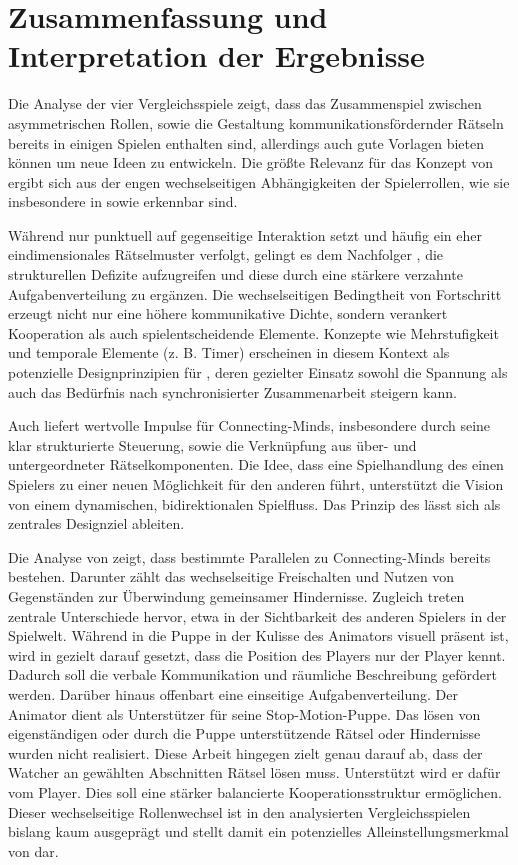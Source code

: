 \section{Zusammenfassung und Interpretation der Ergebnisse}
Die Analyse der vier Vergleichsspiele zeigt, dass das Zusammenspiel zwischen asymmetrischen Rollen, sowie die Gestaltung kommunikationsfördernder Rätseln  bereits in einigen Spielen enthalten sind, allerdings auch gute Vorlagen bieten können um neue Ideen zu entwickeln.
Die größte Relevanz für das Konzept von  ergibt sich aus der engen wechselseitigen Abhängigkeiten der Spielerrollen, wie sie insbesondere in  sowie  erkennbar sind.

Während  nur punktuell auf gegenseitige Interaktion setzt und häufig ein eher eindimensionales Rätselmuster verfolgt, gelingt es dem Nachfolger , die strukturellen Defizite aufzugreifen und diese durch eine stärkere verzahnte Aufgabenverteilung zu ergänzen. Die wechselseitigen Bedingtheit von Fortschritt erzeugt nicht nur eine höhere kommunikative Dichte, sondern verankert Kooperation als auch spielentscheidende Elemente. Konzepte wie Mehrstufigkeit und temporale Elemente (z. B. Timer) erscheinen in diesem Kontext als potenzielle Designprinzipien für , deren gezielter Einsatz sowohl die Spannung als auch das Bedürfnis nach synchronisierter Zusammenarbeit steigern kann.

Auch  liefert wertvolle Impulse für Connecting-Minds, insbesondere durch seine klar strukturierte Steuerung, sowie die Verknüpfung aus über- und untergeordneter Rätselkomponenten. Die Idee, dass eine Spielhandlung des einen Spielers zu einer neuen Möglichkeit für den anderen führt, unterstützt die Vision von einem dynamischen, bidirektionalen Spielfluss. Das Prinzip des  lässt sich als zentrales Designziel ableiten.

Die Analyse von  zeigt, dass bestimmte Parallelen zu Connecting-Minds bereits bestehen. Darunter zählt das wechselseitige Freischalten und Nutzen von Gegenständen zur Überwindung gemeinsamer Hindernisse. Zugleich treten zentrale Unterschiede hervor, etwa in der Sichtbarkeit des anderen Spielers in der Spielwelt. Während in  die Puppe in der Kulisse des Animators visuell präsent ist, wird in  gezielt darauf gesetzt, dass die Position des Players nur der Player kennt. Dadurch soll die verbale Kommunikation und räumliche Beschreibung gefördert werden.
Darüber hinaus offenbart  eine einseitige Aufgabenverteilung. Der Animator dient als Unterstützer für seine Stop-Motion-Puppe. Das lösen von eigenständigen oder durch die Puppe unterstützende Rätsel oder Hindernisse wurden nicht realisiert. Diese Arbeit hingegen zielt genau darauf ab, dass der Watcher an gewählten Abschnitten Rätsel lösen muss. Unterstützt wird er dafür vom Player. Dies soll eine stärker balancierte Kooperationsstruktur ermöglichen. Dieser wechselseitige Rollenwechsel ist in den analysierten Vergleichsspielen bislang kaum ausgeprägt und stellt damit ein potenzielles Alleinstellungsmerkmal von  dar.

